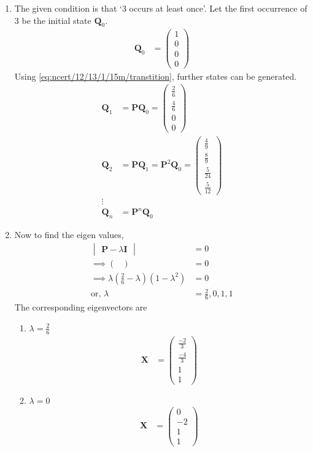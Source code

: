 \documentclass[journal,12pt,two column]{IEEEtran}
\providecommand{\brak}[1]{\ensuremath{\left(#1\right)}}
\providecommand{\brak}[1]{\ensuremath{\left(#1\right)}}         %
\theoremstyle{remark}
\newcommand{\myvec}[1]{\ensuremath{\begin{pmatrix}#1\end{pmatrix}}}
\newcommand{\mydet}[1]{\ensuremath{\begin{vmatrix}#1\end{vmatrix}}}
\let\vec\mathbf
\begin{document}
\begin{enumerate}
\item 
     The given condition is that \lq3 occurs at least once\rq. Let the first occurrence of 3 be the initial state $ \vec{Q}_0$.
    \begin{align}
        \vec{Q}_0 &= \myvec{ 1 \\ 0 \\ 0 \\ 0 } 
    \end{align}
    Using \eqref{eq:ncert/12/13/1/15m/transtition}, further states can be generated.
    \begin{align}
        \vec{Q}_1 &= \vec{P} \vec{Q}_0
            = \myvec{\frac{2}{6} \\[4pt] \frac{4}{6}  \\[4pt] 0 \\ 0}\\
        \vec{Q}_2 &= \vec{P} \vec{Q}_1 = \vec{P}^{2} \vec{Q}_0 
            = \myvec{\frac{4}{9}  \\[4pt] \frac{8}{9}  \\[4pt] \frac{5}{24}\\[4pt] \frac{5}{12}} \\   
        \vdots \\
        \vec{Q}_n &= \vec{P}^{n} \vec{Q}_0
    \end{align}
    \item 
 Now to find the eigen values, 
 \begin{align}
\mydet{\vec{P}-\lambda \vec{I}} &= 0  
\\
 \implies \myvec{} &= 0
 \\
	 \implies \lambda\brak{\frac{2}{6} - \lambda}\brak{1 - \lambda^2} &= 0
	 \\
	 \text{or, }\lambda &= \frac{2}{6}, 0 , 1 , 1 
 \end{align}
 The corresponding eigenvectors are
\begin{enumerate}
\item $\lambda = \frac{2}{6}$
\begin{align}
\vec{X} &= \myvec{\frac{-2}{3}\\[4pt] \frac{-4}{3}\\[4pt] 1\\[4pt] 1}
\end{align}
\item $\lambda = 0$
\begin{align}
\vec{X} &= \myvec{0 \\[2pt] -2\\[2pt] 1\\ 1}

\end{align}
\end{enumerate}
\end{enumerate}
\end{document}
